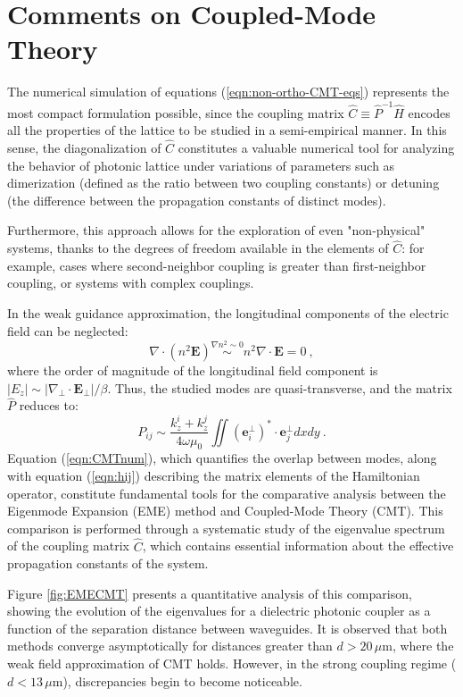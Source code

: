 \section{Comments on Coupled-Mode Theory \label{cap:CMT}}
The numerical simulation of equations (\ref{eqn:non-ortho-CMT-eqs}) represents the most compact formulation possible, since the coupling matrix $\hat{C} \equiv \hat{P}^{-1}\hat{H}$ encodes all the properties of the lattice to be studied in a semi-empirical manner. In this sense, the diagonalization of $\hat{C}$ constitutes a valuable numerical tool for analyzing the behavior of photonic lattice under variations of parameters such as dimerization (defined as the ratio between two coupling constants) or detuning (the difference between the propagation constants of distinct modes).

Furthermore, this approach allows for the exploration of even "non-physical" systems, thanks to the degrees of freedom available in the elements of $\hat{C}$: for example, cases where second-neighbor coupling is greater than first-neighbor coupling, or systems with complex couplings.

In the weak guidance approximation, the longitudinal components of the electric field can be neglected:
\[ \nabla \cdot (n^2 \textbf{E}) \overset{\nabla n^2 \sim 0}{\sim} n^2 \nabla \cdot \textbf{E} = 0 \ ,\]
where the order of magnitude of the longitudinal field component is $|E_z| \sim |\nabla_\perp \cdot \textbf{E}_\perp|/\beta$. Thus, the studied modes are quasi-transverse, and the matrix $\hat{P}$ reduces to:
\begin{equation}
    P_{ij} \sim \frac{k_z^i + k_z^j}{4\omega\mu_0} \iint \left(\textbf{e}_i^\perp\right)^* \cdot \textbf{e}_j^\perp dxdy \ .
    \label{eqn:CMTnum}
\end{equation}
Equation (\ref{eqn:CMTnum}), which quantifies the overlap between modes, along with equation (\ref{eqn:hij}) describing the matrix elements of the Hamiltonian operator, constitute fundamental tools for the comparative analysis between the Eigenmode Expansion (EME) method and Coupled-Mode Theory (CMT). This comparison is performed through a systematic study of the eigenvalue spectrum of the coupling matrix $\hat{C}$, which contains essential information about the effective propagation constants of the system.

Figure \ref{fig:EMECMT} presents a quantitative analysis of this comparison, showing the evolution of the eigenvalues for a dielectric photonic coupler as a function of the separation distance between waveguides. It is observed that both methods converge asymptotically for distances greater than $d > 20\,\mu$m, where the weak field approximation of CMT holds. However, in the strong coupling regime ($d < 13\,\mu$m), discrepancies begin to become noticeable.

